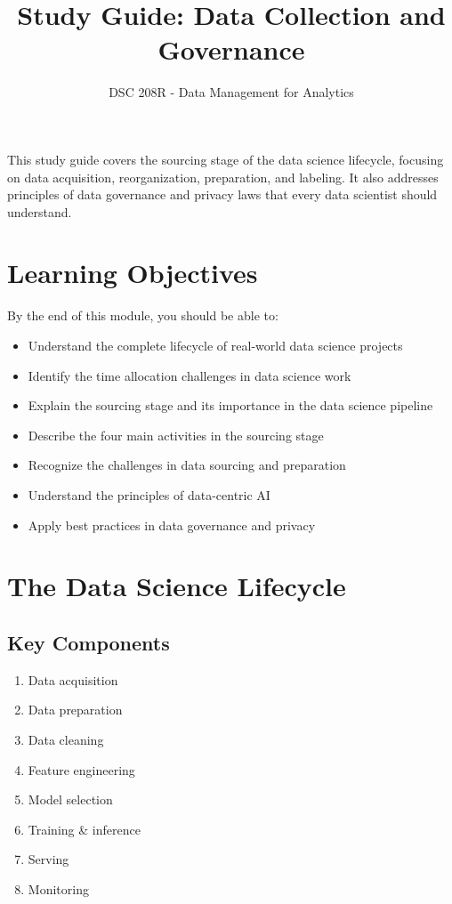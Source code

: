 \documentclass[12pt]{article}
\title{Study Guide: Data Collection and Governance}
\author{DSC 208R - Data Management for Analytics}
\date{}
\begin{document}
\maketitle

\begin{tcolorbox}[colback=blue!5!white,colframe=blue!75!black,title=Overview]
This study guide covers the sourcing stage of the data science lifecycle, focusing on data acquisition, reorganization, preparation, and labeling. It also addresses principles of data governance and privacy laws that every data scientist should understand.
\end{tcolorbox}

\section{Learning Objectives}

By the end of this module, you should be able to:

\begin{itemize}
    \item Understand the complete lifecycle of real-world data science projects
    \item Identify the time allocation challenges in data science work
    \item Explain the sourcing stage and its importance in the data science pipeline
    \item Describe the four main activities in the sourcing stage
    \item Recognize the challenges in data sourcing and preparation
    \item Understand the principles of data-centric AI
    \item Apply best practices in data governance and privacy
\end{itemize}

\section{The Data Science Lifecycle}

\subsection{Key Components}
\begin{enumerate}
    \item Data acquisition
    \item Data preparation
    \item Data cleaning
    \item Feature engineering
    \item Model selection
    \item Training \& inference
    \item Serving
    \item Monitoring
\end{enumerate}
\end{document}

